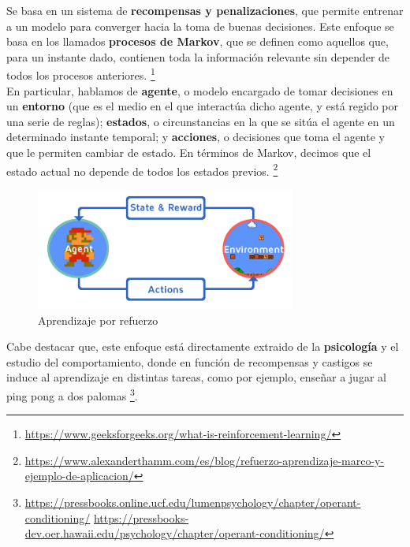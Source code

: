 Se basa en un sistema de \textbf{recompensas y penalizaciones}, que permite entrenar a un modelo para converger hacia la toma de buenas decisiones. Este enfoque se basa en los llamados \textbf{procesos de Markov}, que se definen como aquellos que, para un instante dado, contienen toda la información relevante sin depender de todos los procesos anteriores. \footnote[17]{\url{https://www.geeksforgeeks.org/what-is-reinforcement-learning/}}\\

En particular, hablamos de \textbf{agente}, o modelo encargado de tomar decisiones en un \textbf{entorno} (que es el medio en el que interactúa dicho agente, y está regido por una serie de reglas); \textbf{estados}, o circunstancias en la que se sitúa el agente en un determinado instante temporal; y \textbf{acciones}, o decisiones que toma el agente y que le permiten cambiar de estado. En términos de Markov, decimos que el estado actual no depende de todos los estados previos. \footnote[18]{\url{https://www.alexanderthamm.com/es/blog/refuerzo-aprendizaje-marco-y-ejemplo-de-aplicacion/}}\\

\begin{figure} [H]
	\begin{center}
	\includegraphics[height=4cm]{imagenes/cap1/9_reinforcement.png}
	\end{center}
	\caption[Aprendizaje por refuerzo]{Aprendizaje por refuerzo}
	\label{fig:reinforcement_learning}
\end{figure}

Cabe destacar que, este enfoque está directamente extraido de la \textbf{psicología} y el estudio del comportamiento, donde en función de recompensas y castigos se induce al aprendizaje en distintas tareas, como por ejemplo, enseñar a jugar al ping pong a dos palomas \footnote[19]{\url{https://pressbooks.online.ucf.edu/lumenpsychology/chapter/operant-conditioning/} \url{https://pressbooks-dev.oer.hawaii.edu/psychology/chapter/operant-conditioning/}}.\\

